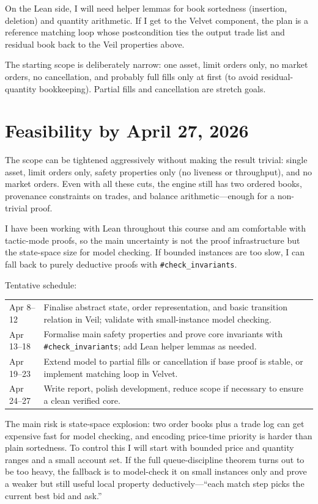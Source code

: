 \documentclass[11pt]{article}
\begin{document}
On the Lean side, I will need helper lemmas for book sortedness (insertion,
deletion) and quantity arithmetic. If I get to the Velvet component, the plan
is a reference matching loop whose postcondition ties the output trade list
and residual book back to the Veil properties above.

The starting scope is deliberately narrow: one asset, limit orders only, no
market orders, no cancellation, and probably full fills only at first (to
avoid residual-quantity bookkeeping). Partial fills and cancellation are
stretch goals.

\section{Feasibility by April 27, 2026}

The scope can be tightened aggressively without making the result trivial:
single asset, limit orders only, safety properties only (no liveness or
throughput), and no market orders. Even with all these cuts, the engine still
has two ordered books, provenance constraints on trades, and balance
arithmetic---enough for a non-trivial proof.

I have been working with Lean throughout this course and am comfortable with
tactic-mode proofs, so the main uncertainty is not the proof infrastructure
but the state-space size for model checking. If bounded instances are too
slow, I can fall back to purely deductive proofs with
\texttt{\#check\_invariants}.

Tentative schedule:

\medskip
\noindent
\begin{tabular}{@{}>{\raggedright}p{3.2cm} p{10.4cm}@{}}
Apr 8--12  & Finalise abstract state, order representation, and basic transition relation in Veil; validate with small-instance model checking.\\[3pt]
Apr 13--18 & Formalise main safety properties and prove core invariants with \texttt{\#check\_invariants}; add Lean helper lemmas as needed.\\[3pt]
Apr 19--23 & Extend model to partial fills or cancellation if base proof is stable, or implement matching loop in Velvet.\\[3pt]
Apr 24--27 & Write report, polish development, reduce scope if necessary to ensure a clean verified core.
\end{tabular}
\medskip

The main risk is state-space explosion: two order books plus a trade log can
get expensive fast for model checking, and encoding price-time priority is
harder than plain sortedness. To control this I will start with bounded price
and quantity ranges and a small account set. If the full queue-discipline
theorem turns out to be too heavy, the fallback is to model-check it on small
instances only and prove a weaker but still useful local property
deductively---``each match step picks the current best bid and ask.''
\end{document}
